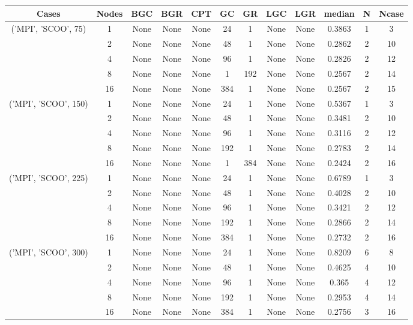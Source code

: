 \begin{tabular}{cccccccccccc}
\hline
Cases & Nodes& BGC& BGR& CPT& GC& GR& LGC& LGR& median & N & Ncase \\
\hline
\multirow{5}{*}{('MPI', 'SCOO', 75)}& 1& None& None& None& 24& 1& None& None& 0.3863& 1& 3\\
& 2& None& None& None& 48& 1& None& None& 0.2862& 2& 10\\
& 4& None& None& None& 96& 1& None& None& 0.2826& 2& 12\\
& 8& None& None& None& 1& 192& None& None& 0.2567& 2& 14\\
& 16& None& None& None& 384& 1& None& None& 0.2567& 2& 15\\
\hline
\multirow{5}{*}{('MPI', 'SCOO', 150)}& 1& None& None& None& 24& 1& None& None& 0.5367& 1& 3\\
& 2& None& None& None& 48& 1& None& None& 0.3481& 2& 10\\
& 4& None& None& None& 96& 1& None& None& 0.3116& 2& 12\\
& 8& None& None& None& 192& 1& None& None& 0.2783& 2& 14\\
& 16& None& None& None& 1& 384& None& None& 0.2424& 2& 16\\
\hline
\multirow{5}{*}{('MPI', 'SCOO', 225)}& 1& None& None& None& 24& 1& None& None& 0.6789& 1& 3\\
& 2& None& None& None& 48& 1& None& None& 0.4028& 2& 10\\
& 4& None& None& None& 96& 1& None& None& 0.3421& 2& 12\\
& 8& None& None& None& 192& 1& None& None& 0.2866& 2& 14\\
& 16& None& None& None& 384& 1& None& None& 0.2732& 2& 16\\
\hline
\multirow{5}{*}{('MPI', 'SCOO', 300)}& 1& None& None& None& 24& 1& None& None& 0.8209& 6& 8\\
& 2& None& None& None& 48& 1& None& None& 0.4625& 4& 10\\
& 4& None& None& None& 96& 1& None& None& 0.365& 4& 12\\
& 8& None& None& None& 192& 1& None& None& 0.2953& 4& 14\\
& 16& None& None& None& 384& 1& None& None& 0.2756& 3& 16\\
\hline
\end{tabular}
